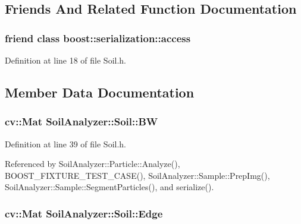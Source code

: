 \subsection{Friends And Related Function Documentation}
\hypertarget{class_soil_analyzer_1_1_soil_ac98d07dd8f7b70e16ccb9a01abf56b9c}{}
\subsubsection[{boost\+::serialization\+::access}]{\setlength{\rightskip}{0pt plus 5cm}friend class boost\+::serialization\+::access\hspace{0.3cm}{\ttfamily [friend]}}\label{class_soil_analyzer_1_1_soil_ac98d07dd8f7b70e16ccb9a01abf56b9c}


Definition at line 18 of file Soil.\+h.



\subsection{Member Data Documentation}
\hypertarget{class_soil_analyzer_1_1_soil_ae11b578192ebae3165f75c09d6116f74}{}
\subsubsection[{B\+W}]{\setlength{\rightskip}{0pt plus 5cm}cv\+::\+Mat Soil\+Analyzer\+::\+Soil\+::\+B\+W}\label{class_soil_analyzer_1_1_soil_ae11b578192ebae3165f75c09d6116f74}


Definition at line 39 of file Soil.\+h.



Referenced by Soil\+Analyzer\+::\+Particle\+::\+Analyze(), B\+O\+O\+S\+T\+\_\+\+F\+I\+X\+T\+U\+R\+E\+\_\+\+T\+E\+S\+T\+\_\+\+C\+A\+S\+E(), Soil\+Analyzer\+::\+Sample\+::\+Prep\+Img(), Soil\+Analyzer\+::\+Sample\+::\+Segment\+Particles(), and serialize().

\hypertarget{class_soil_analyzer_1_1_soil_ab867a74ecebcd5a3d84e2f9ea806b874}{}
\subsubsection[{Edge}]{\setlength{\rightskip}{0pt plus 5cm}cv\+::\+Mat Soil\+Analyzer\+::\+Soil\+::\+Edge}\label{class_soil_analyzer_1_1_soil_ab867a74ecebcd5a3d84e2f9ea806b874}


